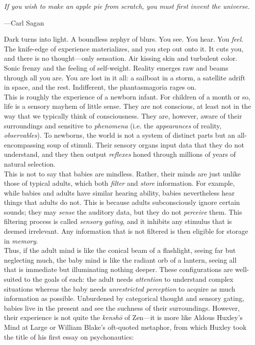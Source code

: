 \vspace{4mm}
\begin{displayquote}
	\textit{If you wish to make an apple pie from scratch, you must first invent the universe.}
	\vspace{2mm}
	\begin{flushright}
		---Carl Sagan
	\end{flushright}
\end{displayquote}
\vspace{4mm}

Dark turns into light. A boundless zephyr of blurs. You see. You hear. You \textit{feel}. The knife-edge of experience materializes, and you step out onto it. It cuts you, and there is no thought---only sensation. Air kissing skin and turbulent color. Sonic frenzy and the feeling of self-weight. Reality emerges raw and beams through all you are. You are lost in it all: a sailboat in a storm, a satellite adrift in space, and the rest. Indifferent, the phantasmagoria rages on. \\

This is roughly the experience of a newborn infant. For children of a month or so, life is a sensory mayhem of little sense. They are not conscious, at least not in the way that we typically think of consciousness. They are, however, aware of their surroundings and sensitive to \textit{phenomena} (i.e. the \textit{appearances} of reality, \textit{observables}). To newborns, the world is not a system of distinct parts but an all-encompassing soup of stimuli. Their sensory organs input data that they do not understand, and they then output \textit{reflexes} honed through millions of years of natural selection. \\

This is not to say that babies are mindless. Rather, their minds are just unlike those of typical adults, which both \textit{filter} and \textit{store} information. For example, while babies and adults have similar hearing ability, babies nevertheless hear things that adults do not. This is because adults subconsciously ignore certain sounds; they may \textit{sense} the auditory data, but they do not \textit{perceive} them. This filtering process is called \textit{sensory gating}, and it inhibits any stimulus that is deemed irrelevant. Any information that is not filtered is then eligible for storage in \textit{memory}. \\

Thus, if the adult mind is like the conical beam of a flashlight, seeing far but neglecting much, the baby mind is like the radiant orb of a lantern, seeing all that is immediate but illuminating nothing deeper. These configurations are well-suited to the goals of each: the adult needs \textit{attention} to understand complex situations whereas the baby needs \textit{unrestricted perception} to acquire as much information as possible. Unburdened by categorical thought and sensory gating, babies live in the present and see the suchness of their surroundings. However, their experience is not quite the \textit{kensh\=o} of Zen---it is more like Aldous Huxley's Mind at Large or William Blake's oft-quoted metaphor, from which Huxley took the title of his first essay on psychonautics: \\

